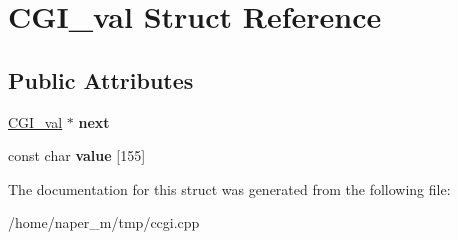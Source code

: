 \hypertarget{struct_c_g_i__val}{\section{C\-G\-I\-\_\-val Struct Reference}
\label{struct_c_g_i__val}
}
\subsection*{Public Attributes}
\begin{DoxyCompactItemize}
\item 
\hypertarget{struct_c_g_i__val_ad54618810dc7804069663c65f0d4b664}{\hyperlink{struct_c_g_i__val}{C\-G\-I\-\_\-val} $\ast$ {\bfseries next}}\label{struct_c_g_i__val_ad54618810dc7804069663c65f0d4b664}

\item 
\hypertarget{struct_c_g_i__val_a66fde1be8387067948d3b73c44566d8b}{const char {\bfseries value} \mbox{[}155\mbox{]}}\label{struct_c_g_i__val_a66fde1be8387067948d3b73c44566d8b}

\end{DoxyCompactItemize}


The documentation for this struct was generated from the following file\-:\begin{DoxyCompactItemize}
\item 
/home/naper\-\_\-m/tmp/ccgi.\-cpp\end{DoxyCompactItemize}

